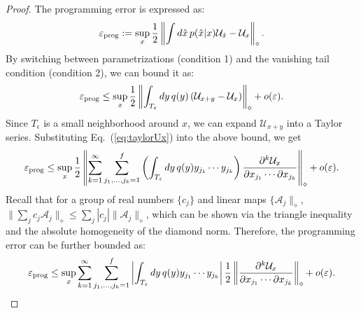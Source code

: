 \documentclass[11pt,letterpaper]{article}
\def\eps{\varepsilon}
\begin{document}
\begin{proof} 
    The programming error is expressed as:
    \begin{align}
        \eps_{\rm prog}:=\sup_{x}\frac12\left\|\int d\hat{x}\,p(\hat{x}|x)\mathcal{U}_{\hat{x}}-\mathcal{U}_x\right\|_{\diamond}.
    \end{align}
    By switching between parametrizations (condition 1) and the vanishing tail condition (condition 2), we can bound it as:
    \begin{align}
        \eps_{\rm prog}\le\sup_{x}\frac12\left\|\int_{T_\eps} dy\,q(y)\left(\mathcal{U}_{x+y}-\mathcal{U}_x\right)\right\|_{\diamond}+o(\eps).
    \end{align}
    Since $T_\epsilon$ is a small neighborhood around $x$, we can expand $\mathcal{U}_{x+y}$ into a Taylor series.
    Substituting Eq.~(\ref{eq:taylorUx}) into the above bound, we get
     \begin{align}
        \eps_{\rm prog}\le\sup_{x}\frac12\left\|\sum_{k=1}^{\infty}\sum_{j_1,\dots,j_k=1}^{f}\left(\int_{T_\eps} dy\,q(y)y_{j_1}\cdots y_{j_k}\right)\frac{\partial^k \mathcal{U}_x}{\partial x_{j_1}\cdots\partial x_{j_k}}\right\|_{\diamond}+o(\eps).
    \end{align}
    Recall that for a group of real numbers $\{c_j\}$ and linear maps $\{\mathcal{A}_j\|_{\diamond}$, $\|\sum_j c_j\mathcal{A}_j\|_{\diamond}\le\sum_j|c_j|\|\mathcal{A}_j\|_{\diamond}$, which can be shown via the triangle inequality and the absolute homogeneity of the diamond norm. Therefore, the programming error can be further bounded as:
    \begin{align}\label{eq:progerr1}
        \eps_{\rm prog}\le\sup_{x}\sum_{k=1}^{\infty}\sum_{j_1,\dots,j_k=1}^{f}\left|\int_{T_\eps} dy\,q(y)y_{j_1}\cdots y_{j_k}\right|\frac12\left\|\frac{\partial^k \mathcal{U}_x}{\partial x_{j_1}\cdots\partial x_{j_k}}\right\|_{\diamond}+o(\eps).
    \end{align}
    

\end{proof}
\end{document}

